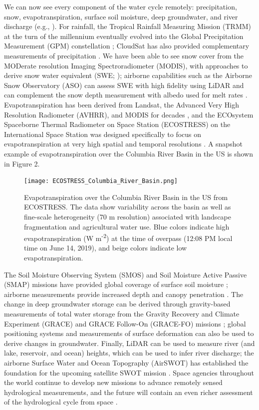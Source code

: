 \documentclass[preprint,review, 12pt]{elsarticle}
\begin{document}
We can now see every component of the water cycle remotely: precipitation, snow, evapotranspiration, surface soil moisture, deep groundwater, and river discharge (e.g., \citealp{Andreadis2017}). For rainfall, the Tropical Rainfall Measuring Mission (TRMM) at the turn of the millennium \citep{Kummerow1998} eventually evolved into the Global Precipitation Measurement (GPM) constellation \citep{Smith2007}; CloudSat has also provided complementary measurements of precipitation \citep{Stephens2002}. We have been able to see snow cover from the MODerate resolution Imaging Spectroradiometer (MODIS), with approaches to derive snow water equivalent (SWE; \citealp{Hall2002}); airborne capabilities such as the Airborne Snow Observatory (ASO) can assess SWE with high fidelity using LiDAR and can complement the snow depth measurement with albedo used for melt rates \citep{Painter2016}. Evapotranspiration has been derived from Landsat, the Advanced Very High Resolution Radiometer (AVHRR), and MODIS for decades \citep{Fisher2017}, and the ECOsystem Spaceborne Thermal Radiometer on Space Station (ECOSTRESS) on the International Space Station was designed specifically to focus on evapotranspiration at very high spatial and temporal resolutions \citep{Fisher2019}. A snapshot example of evapotranspiration over the Columbia River Basin in the US is shown in Figure 2.

\begin{figure}[hp]
\centering\texttt{[image: ECOSTRESS\_Columbia\_River\_Basin.png]}
\caption{Evapotranspiration over the Columbia River Basin in the US from ECOSTRESS. The data show variability across the basin as well as fine-scale heterogeneity (70 m resolution) associated with landscape fragmentation and agricultural water use. Blue colors indicate high evapotranspiration (W m\textsuperscript{-2}) at the time of overpass (12:08 PM local time on June 14, 2019), and beige colors indicate low evapotranspiration.}
\end{figure}

The Soil Moisture Observing System (SMOS) and Soil Moisture Active Passive (SMAP) missions have provided global coverage of surface soil moisture \citep{Kerr2001, entekhabi2010soil}; airborne measurements provide increased depth and canopy penetration \citep{Colliander2017}. The change in deep groundwater storage can be derived through gravity-based measurements of total water storage from the Gravity Recovery and Climate Experiment (GRACE) and GRACE Follow-On (GRACE-FO) missions \citep{Rodell2002, Sheard2012}; global positioning systems \citep{Argus2014} and measurements of surface deformation \citep{Farr2014} can also be used to derive changes in groundwater. Finally, LiDAR can be used to measure river (and lake, reservoir, and ocean) heights, which can be used to infer river discharge; the airborne Surface Water and Ocean Topography (AirSWOT) has established the foundation for the upcoming satellite SWOT mission \citep{Durand2010}. Space agencies throughout the world continue to develop new missions to advance remotely sensed hydrological measurements, and the future will contain an even richer assessment of the hydrological cycle from space \citep{NationalAcademiesofSciences2018}. 
\end{document}
